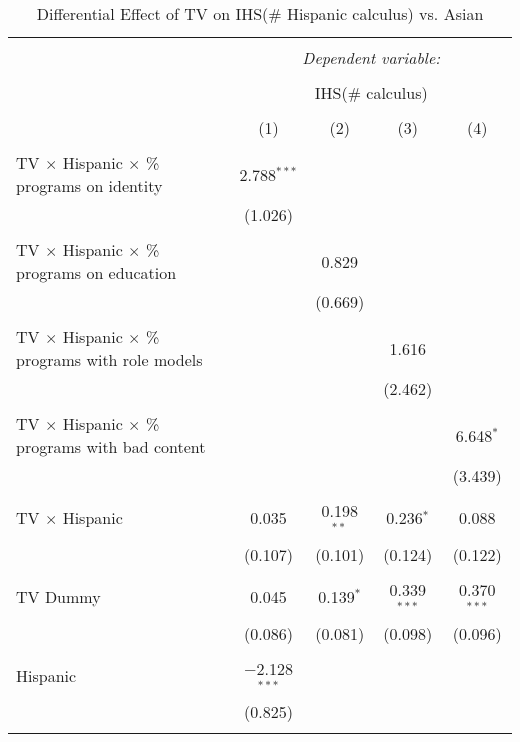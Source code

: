 
\begin{table}[!htbp] \centering 
  \caption{Differential Effect of TV on IHS(\# Hispanic calculus) vs. Asian} 
  \label{} 
\begin{tabular}{@{\extracolsep{-2pt}}lcccc} 
\\[-1.8ex]\hline 
\hline \\[-1.8ex] 
 & \multicolumn{4}{c}{\textit{Dependent variable:}} \\ 
\cline{2-5} 
\\[-1.8ex] & \multicolumn{4}{c}{IHS(\# calculus)} \\ 
\\[-1.8ex] & (1) & (2) & (3) & (4)\\ 
\hline \\[-1.8ex] 
 TV $\times$ Hispanic $\times$ \% programs on identity & 2.788$^{***}$ &  &  &  \\ 
  & (1.026) &  &  &  \\ 
  & & & & \\ 
 TV $\times$ Hispanic $\times$ \% programs on education &  & 0.829 &  &  \\ 
  &  & (0.669) &  &  \\ 
  & & & & \\ 
 TV $\times$ Hispanic $\times$ \% programs with role models &  &  & 1.616 &  \\ 
  &  &  & (2.462) &  \\ 
  & & & & \\ 
 TV $\times$ Hispanic $\times$ \% programs with bad content &  &  &  & 6.648$^{*}$ \\ 
  &  &  &  & (3.439) \\ 
  & & & & \\ 
 TV $\times$ Hispanic & 0.035 & 0.198$^{**}$ & 0.236$^{*}$ & 0.088 \\ 
  & (0.107) & (0.101) & (0.124) & (0.122) \\ 
  & & & & \\ 
 TV Dummy & 0.045 & 0.139$^{*}$ & 0.339$^{***}$ & 0.370$^{***}$ \\ 
  & (0.086) & (0.081) & (0.098) & (0.096) \\ 
  & & & & \\ 
 Hispanic & $-$2.128$^{***}$ &  &  &  \\ 
  & (0.825) &  &  &  \\ 
  & & & & \\ 

\end{tabular}
\end{table}
